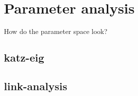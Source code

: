 

\section{Parameter analysis}

How do the parameter space look?

\subsection{katz-eig}

\subsection{link-analysis}

